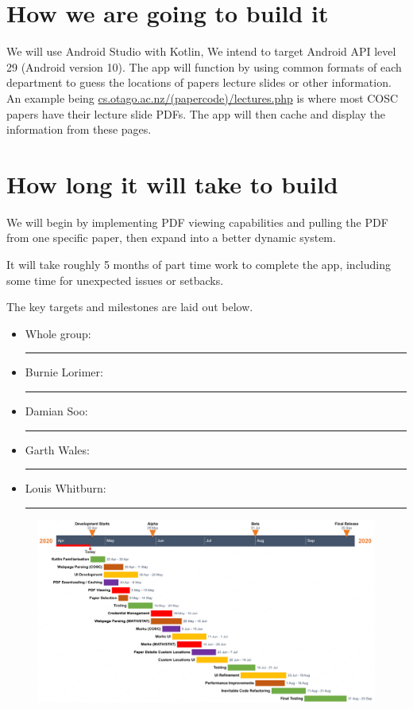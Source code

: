 \documentclass{article}
\begin{document}
	\section{How we are going to build it}

	We will use Android Studio with Kotlin, We intend to target Android API level 29 (Android version 10). The app will function by using common formats of each department to guess the locations of papers lecture slides or other information. An example being \url{cs.otago.ac.nz/(papercode)/lectures.php} is where most COSC papers have their lecture slide PDFs. The app will then cache and display the information from these pages.

	\section{How long it will take to build}

	We will begin by implementing PDF viewing capabilities and pulling the PDF from one specific paper, then expand into a better dynamic system. 

	It will take roughly 5 months of part time work to complete the app, including some time for unexpected issues or setbacks.
	
	The key targets and milestones are laid out below.
	
	\begin{itemize}
		\item Whole group: {\color{ag} \rule{\baselineskip}{\baselineskip}}
		\item Burnie Lorimer: {\color{bl} \rule{\baselineskip}{\baselineskip}}
		\item Damian Soo: {\color{ds} \rule{\baselineskip}{\baselineskip}}
		\item Garth Wales: {\color{gw} \rule{\baselineskip}{\baselineskip}}
		\item Louis Whitburn: {\color{lw} \rule{\baselineskip}{\baselineskip}}
	\end{itemize}
	
	\begin{figure}[H]
		\centering
		\includegraphics[width=\linewidth]{chart.png}
	\end{figure}
	
\end{document}

